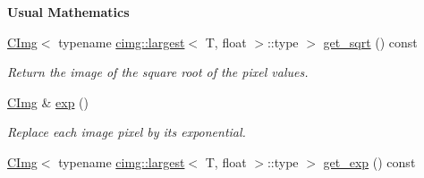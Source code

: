 \begin{Indent}{\bf Usual Mathematics}
\begin{DoxyCompactItemize}
\hyperlink{structcimg__library_1_1_c_img}{CImg}$<$ typename \hyperlink{structcimg__library_1_1cimg_1_1largest}{cimg::largest}$<$ T, float $>$::type $>$ \hyperlink{structcimg__library_1_1_c_img_a494d3f79f0d6efb646d28e500745d33c}{get\_\-sqrt} () const 
\begin{DoxyCompactList}\small\item\em Return the image of the square root of the pixel values. \item\end{DoxyCompactList}\item 
\hypertarget{structcimg__library_1_1_c_img_a216d7a497c11ef15a3a948bad37134f3}{
\hyperlink{structcimg__library_1_1_c_img}{CImg} \& \hyperlink{structcimg__library_1_1_c_img_a216d7a497c11ef15a3a948bad37134f3}{exp} ()}
\label{structcimg__library_1_1_c_img_a216d7a497c11ef15a3a948bad37134f3}

\begin{DoxyCompactList}\small\item\em Replace each image pixel by its exponential. \item\end{DoxyCompactList}\item 
\hypertarget{structcimg__library_1_1_c_img_a2bccc16ccd3a8c0d36d89bb7d3292c21}{
\hyperlink{structcimg__library_1_1_c_img}{CImg}$<$ typename \hyperlink{structcimg__library_1_1cimg_1_1largest}{cimg::largest}$<$ T, float $>$::type $>$ \hyperlink{structcimg__library_1_1_c_img_a2bccc16ccd3a8c0d36d89bb7d3292c21}{get\_\-exp} () const }
\label{structcimg__library_1_1_c_img_a2bccc16ccd3a8c0d36d89bb7d3292c21}


\end{DoxyCompactItemize}
\end{Indent}
